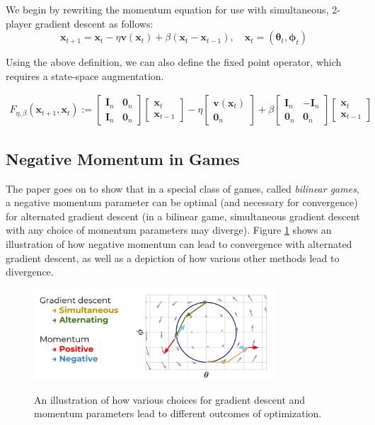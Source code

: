 \documentclass{article}
\renewcommand{\vec}[1]{\ensuremath{\boldsymbol{#1}}}
\begin{document}
We begin by rewriting the momentum equation for use with simultaneous, 2-player gradient descent as follows:
$$\vec{x}_{t+1} = \vec{x}_t - \eta\vec{v}(\vec{x}_t) + \beta(\vec{x}_t - \vec{x}_{t-1}), \quad \vec{x}_t = (\vec{\theta}_t, \vec{\phi}_t)$$

Using the above definition, we can also define the fixed point operator, which requires a state-space augmentation.

\begin{align}
    F_{\eta, \beta}(\vec{x}_{t+1}, \vec{x}_t) := 
    \begin{bmatrix}
        \vec{I}_n & \vec{0}_n \\
        \vec{I}_n & \vec{0}_n
    \end{bmatrix}
    \begin{bmatrix}
        \vec{x}_t \\
        \vec{x}_{t-1}
    \end{bmatrix} 
    - \eta 
    \begin{bmatrix}
        \vec{v}(\vec{x}_t) \\
        \vec{0}_n
    \end{bmatrix} 
    + \beta 
    \begin{bmatrix}
        \vec{I}_n & -\vec{I}_n \\
        \vec{0}_n & \vec{0}_n
    \end{bmatrix}
    \begin{bmatrix}
        \vec{x}_t \\
        \vec{x}_{t-1}
    \end{bmatrix} 
\end{align}

\subsection{Negative Momentum in Games}

The paper goes on to show that in a special class of games, called \textit{bilinear games}, a negative momentum parameter can be optimal (and necessary for convergence) for alternated gradient descent (in a bilinear game, simultaneous gradient descent with any choice of momentum parameters may diverge). Figure \ref{fig:bilinearconv} shows an illustration of how negative momentum can lead to convergence with alternated gradient descent, as well as a depiction of how various other methods lead to divergence. 

\begin{figure}[h!]
    \centering
    \includegraphics[width=0.8\textwidth]{bilinearconv.png}
    \label{fig:bilinearconv}
    \caption{An illustration of how various choices for gradient descent and momentum parameters lead to different outcomes of optimization.}
\end{figure}
\end{document}
